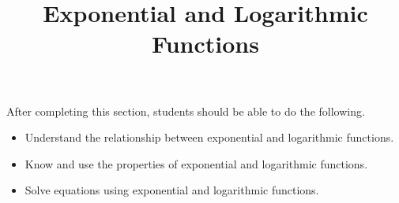 \documentclass{ximera}
\title{Exponential and Logarithmic Functions}
\begin{document}
\begin{abstract} 
\end{abstract}

\maketitle

\begin{sectionOutcomes}
After completing this section, students should be able to do the following.

\begin{itemize}
	\item Understand the relationship between exponential and logarithmic functions.
	\item Know and use the properties of exponential and logarithmic functions.
	\item Solve equations using exponential and logarithmic functions.
\end{itemize}
\end{sectionOutcomes}
\end{document}
